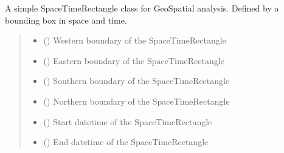 \documentclass[letterpaper,10pt,english]{sphinxmanual}
\begin{document}

\begin{fulllineitems}
\label{\detokenize{shape:geotrees.shape.SpaceTimeRectangle}}
\pysigstartsignatures
\pysiglinewithargsret
{}
{\sphinxparamcomma {}\sphinxparamcomma {}\sphinxparamcomma {}\sphinxparamcomma {}\sphinxparamcomma {}}
{}
\pysigstopsignatures
\sphinxAtStartPar
A simple SpaceTimeRectangle class for GeoSpatial analysis. Defined by a
bounding box in space and time.
\begin{quote}\begin{description}
\begin{itemize}
\item {}
\sphinxAtStartPar
{} () \textendash{} Western boundary of the SpaceTimeRectangle

\item {}
\sphinxAtStartPar
{} () \textendash{} Eastern boundary of the SpaceTimeRectangle

\item {}
\sphinxAtStartPar
{} () \textendash{} Southern boundary of the SpaceTimeRectangle

\item {}
\sphinxAtStartPar
{} () \textendash{} Northern boundary of the SpaceTimeRectangle

\item {}
\sphinxAtStartPar
{} () \textendash{} Start datetime of the SpaceTimeRectangle

\item {}
\sphinxAtStartPar
{} () \textendash{} End datetime of the SpaceTimeRectangle


\end{itemize}
\end{description}
\end{quote}
\end{fulllineitems}
\end{document}
